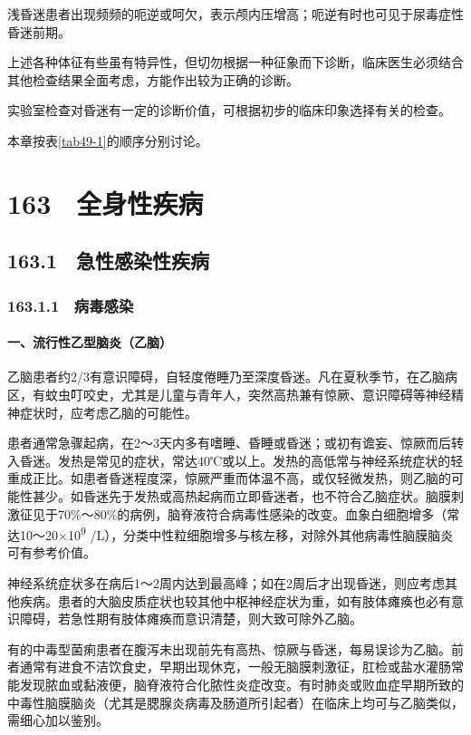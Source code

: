浅昏迷患者出现频频的呃逆或呵欠，表示颅内压增高；呃逆有时也可见于尿毒症性昏迷前期。

上述各种体征有些虽有特异性，但切勿根据一种征象而下诊断，临床医生必须结合其他检查结果全面考虑，方能作出较为正确的诊断。

实验室检查对昏迷有一定的诊断价值，可根据初步的临床印象选择有关的检查。

本章按表\ref{tab49-1}的顺序分别讨论。

\protect\hypertarget{text00370.html}{}{}

\section{163　全身性疾病}

\subsection{163.1　急性感染性疾病}

\subsubsection{163.1.1　病毒感染}

\paragraph{一、流行性乙型脑炎（乙脑）}

乙脑患者约2/3有意识障碍，自轻度倦睡乃至深度昏迷。凡在夏秋季节，在乙脑病区，有蚊虫叮咬史，尤其是儿童与青年人，突然高热兼有惊厥、意识障碍等神经精神症状时，应考虑乙脑的可能性。

患者通常急骤起病，在2～3天内多有嗜睡、昏睡或昏迷；或初有谵妄、惊厥而后转入昏迷。发热是常见的症状，常达40℃或以上。发热的高低常与神经系统症状的轻重成正比。如患者昏迷程度深，惊厥严重而体温不高，或仅轻微发热，则乙脑的可能性甚少。如昏迷先于发热或高热起病而立即昏迷者，也不符合乙脑症状。脑膜刺激征见于70\%～80\%的病例，脑脊液符合病毒性感染的改变。血象白细胞增多（常达10～20×10\textsuperscript{9}
/L），分类中性粒细胞增多与核左移，对除外其他病毒性脑膜脑炎可有参考价值。

神经系统症状多在病后1～2周内达到最高峰；如在2周后才出现昏迷，则应考虑其他疾病。患者的大脑皮质症状也较其他中枢神经症状为重，如有肢体瘫痪也必有意识障碍，若急性期有肢体瘫痪而意识清楚，则大致可除外乙脑。

有的中毒型菌痢患者在腹泻未出现前先有高热、惊厥与昏迷，每易误诊为乙脑。前者通常有进食不洁饮食史，早期出现休克，一般无脑膜刺激征，肛检或盐水灌肠常能发现脓血或黏液便，脑脊液符合化脓性炎症改变。有时肺炎或败血症早期所致的中毒性脑膜脑炎（尤其是腮腺炎病毒及肠道所引起者）在临床上均可与乙脑类似，需细心加以鉴别。


